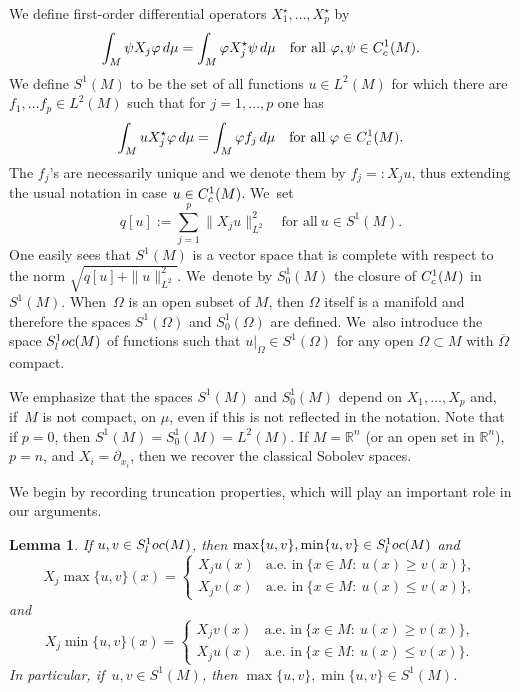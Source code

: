 \documentclass[11pt]{article}
\newcommand{\rc}{\textup{c}}
\newcommand{\loc}{\textup{loc}}
\newtheorem{lemma}[theorem]{Lemma}
\theoremstyle{definition}
\let\phi\varphi
\newcommand{\1}{\mathbbm{1}}
\numberwithin{equation}{section}
\begin{document}
We define first-order differential operators $X_1^\star,\ldots,X_p^\star$ by
\[
\int_M \psi X_j \phi\,d\mu = \int_M \phi X_j^\star \psi\,d\mu
\quad\text{for all}\ \phi,\psi\in C^1_\rc(M).
\]
We define $S^1(M)$ to be the set of all functions $u\in L^2(M)$ for which there are $f_1,\ldots f_p\in L^2(M)$ such that for $j=1,\ldots,p$ one has
\[
\int_M u X_j^\star\phi\,d\mu = \int_M \phi f_j\,d\mu
\quad\text{for all}\ \phi\in C^1_\rc(M).
\]
The $f_j$'s are necessarily unique and we denote them by $f_j=:X_j u$, thus extending the usual notation in case $u\in C^1_\rc(M)$. We~set
\[
q[u] := \sum_{j=1}^p \|X_j u\|_{L^2}^2
\quad\text{for all}\ u\in S^1(M).
\]
One easily sees that $S^1(M)$ is a vector space that is complete with respect to the norm $\sqrt{q[u] + \|u\|_{L^2}^2}$. We~denote by $S^1_0(M)$ the closure of $C^1_\rc(M)$ in $S^1(M)$. When~$\Omega$ is an open subset of $M$, then $\Omega$ itself is a manifold and therefore the spaces $S^1(\Omega)$ and $S^1_0(\Omega)$ are defined. We~also introduce the space $S^1_\loc(M)$ of functions such that $u|_\Omega \in S^1(\Omega)$ for any open $\Omega\subset M$ with $\overline\Omega$ compact.

We emphasize that the spaces $S^1(M)$ and $S^1_0(M)$ depend on $X_1,\ldots,X_p$ and, if~$M$ is not compact, on $\mu$, even if this is not reflected in the notation. Note that if $p=0$, then $S^1(M)=S^1_0(M)=L^2(M)$.
If $M=\mathbb R^n$ (or an open set in $\mathbb R^n$), $p=n$, and $X_i=\partial_{x_i}$, then we recover the classical Sobolev spaces.

We begin by recording truncation properties, which will play an important role in our arguments.

\begin{lemma}\label{truncation}
If $u,v\in S^1_\loc(M)$, then $\max\{u,v\}, \min\{u,v\}\in S^1_\loc(M)$ and
\[
X_j \max\{u,v\}(x) = \begin{cases}
X_j u(x) & \text{a.e.\ in}\ \{ x\in M:\ u(x)\geq v(x)\},\\
X_jv(x) & \text{a.e.\ in}\ \{ x\in M:\ u(x)\leq v(x)\},
\end{cases}
\]
and
\[
X_j \min\{u,v\}(x) = \begin{cases}
X_j v(x) & \text{a.e.\ in}\ \{ x \in M:\ u(x)\geq v(x) \},\\
X_ju(x) & \text{a.e.\ in}\ \{ x \in M:\ u(x)\leq v(x) \}.
\end{cases}
\]
In particular, if~$u,v\in S^1(M)$, then $\max\{u,v\}, \min\{u,v\}\in S^1(M)$.
\end{lemma}
\end{document}
